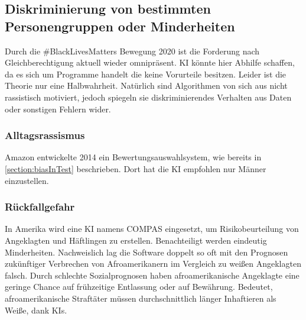 \documentclass[12pt,oneside,a4paper,parskip]{scrbook}
\begin{document}
\subsection{Diskriminierung von bestimmten Personengruppen oder Minderheiten}
Durch die \#BlackLivesMatters Bewegung 2020 ist die Forderung nach Gleichberechtigung aktuell wieder omnipräsent. KI könnte hier Abhilfe schaffen, da es sich um Programme handelt die keine Vorurteile besitzen. Leider ist die Theorie nur eine Halbwahrheit. Natürlich sind Algorithmen von sich aus nicht rassistisch motiviert, jedoch spiegeln sie diskriminierendes Verhalten aus Daten oder sonstigen Fehlern wider.
\subsubsection{Alltagsrassismus}
Amazon entwickelte 2014 ein Bewertungsauswahlsystem, wie bereits in \ref{section:biasInTest} beschrieben. Dort hat die KI empfohlen nur Männer einzustellen. \\
\subsubsection{Rückfallgefahr}
In Amerika wird eine KI namens COMPAS eingesetzt, um Risikobeurteilung von Angeklagten und Häftlingen zu erstellen. Benachteiligt werden eindeutig Minderheiten. Nachweislich lag die Software doppelt so oft mit den Prognosen zukünftiger Verbrechen von Afroamerikanern im Vergleich zu weißen Angeklagten falsch.
Durch schlechte Sozialprognosen haben afroamerikanische Angeklagte eine geringe Chance auf frühzeitige Entlassung oder auf Bewährung. Bedeutet, afroamerikanische Straftäter müssen durchschnittlich länger Inhaftieren als Weiße, dank KIs.
\end{document}
